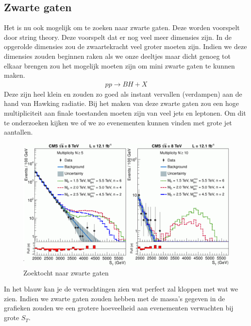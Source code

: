 \documentclass[../main.tex]{subfiles}
\begin{document}
\subsection{Zwarte gaten}%
\label{sub:zwarte_gaten}

Het is nu ook mogelijk om te zoeken naar zwarte gaten. Deze worden voorspelt door string theory. Deze voorspelt dat er nog veel meer dimensies zijn. In de opgerolde dimensies zou de zwaartekracht veel groter moeten zijn. Indien we deze dimensies zouden beginnen raken als we onze deeltjes maar dicht genoeg tot elkaar brengen zou het mogelijk moeten zijn om mini zwarte gaten te kunnen maken.
\begin{equation}
    \begin{aligned}
        \label{eq:zwarte_gaten}
        p p \rightarrow B H+X
    \end{aligned}
\end{equation}
Deze zijn heel klein en zouden zo goed als instant vervallen (verdampen) aan de hand van Hawking radiatie. Bij het maken van deze zwarte gaten zou een hoge multipliciteit aan finale toestanden moeten zijn van veel jets en leptonen. Om dit te onderzoeken kijken we of we zo evenementen kunnen vinden met grote jet aantallen.
\begin{figure}[h]
    \centering
    \includegraphics[width=0.6\linewidth]{physics_beyond_the_standard_model/zwarte_gaten.png}
    \caption{Zoektocht naar zwarte gaten}%
    \label{fig:physics_}
\end{figure}

In het blauw kan je de verwachtingen zien wat perfect zal kloppen met wat we zien. Indien we zwarte gaten zouden hebben met de massa's gegeven in de grafieken zouden we een grotere hoeveelheid aan evenementen verwachten bij grote $S_T$.
\end{document}
